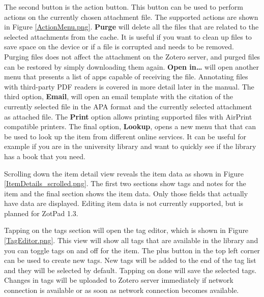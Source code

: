 \documentclass[oneside, openany, 12pt]{tufte-book}
\newcommand{\image}[2]{
	\center
	\fbox{\texttt{[image: images/iPhone/\{\#2]}}}

	\caption{#1 \label{#2}}
	\smallskip\noindent\small Figure \ref{#2}: #1
	}
\newcommand{\ipadfootnote}[1]{}
\newcommand{\image}[2]{
	\caption{#1}
	\label{#2}
	\fbox{\texttt{[image: images/iPad/\{\#2]}}}
	}
\newcommand{\ipadfootnote}[1]{\footnote{#1}}
\begin{document}
\begin{figure}
\image{Opening the action menu}{ActionMenu.png}
\end{figure}

The second button is the action button. This button can be used to perform actions on the currently chosen attachment file. The supported actions are shown in Figure \ref{ActionMenu.png}. \textbf{Purge} will delete all the files that are related to the selected attachments from the cache. It is useful if you want to clean up files to save space on the device or if a file is corrupted and needs to be removed. Purging files does not affect the attachment on the Zotero server, and purged files can be restored by simply downloading them again. \textbf{Open in\ldots} will open another menu that presents a list of apps capable of receiving the file. Annotating files with third-party PDF readers is covered in more detail later in the manual. The third option, \textbf{Email}, will open an email template with the citation of the currently selected file in the APA format and the currently selected attachment as attached file. The \textbf{Print} option allows printing supported files with AirPrint compatible printers. The final option, \textbf{Lookup}, opens a new menu that that can be used to look up the item from different online services. It can be useful for example if you are in the university library and want to quickly see if the library has a book that you need\ipadfootnote{The lookup functionality is nearly identical to Zotero's locate functionality \url{http://www.zotero.org/support/locate}}.

\clearpage

\begin{figure}
\image{Bottom part of item detail view}{ItemDetails_scrolled.png}
\end{figure}

Scrolling down the item detail view reveals the item data as shown in Figure \ref{ItemDetails_scrolled.png}. The first two sections show tags and notes for the item and the final section shows the item data. Only those fields that actually have data are displayed. Editing item data is not currently supported, but is planned for ZotPad 1.3.

Tapping on the tags section will open the tag editor, which is shown in Figure \ref{TagEditor.png}. This view will show all tags that are available in the library and you can toggle tags on and off for the item. The plus button in the top left corner can be used to create new tags. New tags will be added to the end of the tag list and they will be selected by default. Tapping on done will save the selected tags. Changes in tags will be uploaded to Zotero server immediately if network connection is available or as soon as network connection becomes available.
\end{document}
